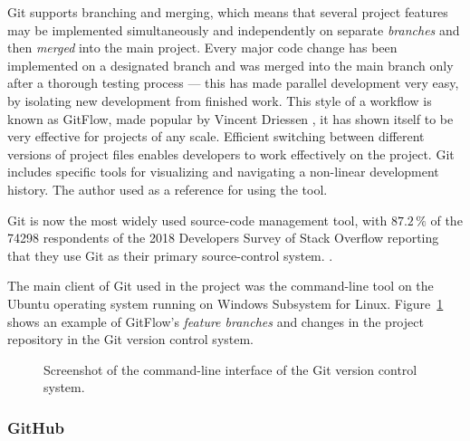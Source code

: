 \documentclass[english,engineering]{wizthesis}
\begin{document}
Git supports branching and merging, which means that several project features
may be implemented simultaneously and independently on separate \emph{branches}
and then \emph{merged} into the main project. Every major code change has been
implemented on a designated branch and was merged into the main branch only
after a thorough testing process --- this has made parallel development very
easy, by isolating new development from finished work. This style of a workflow
is known as GitFlow, made popular by Vincent Driessen \cite{git-flow}, it has
shown itself to be very effective for projects of any scale. Efficient switching
between different versions of project files enables developers to work
effectively on the project. Git includes specific tools for visualizing and
navigating a non-linear development history. The author used \cite{chacon-2014}
as a reference for using the tool.

Git is now the most widely used source-code management tool, with $87.2\,\%$ of
the 74298 respondents of the 2018 Developers Survey of Stack Overflow reporting
that they use Git as their primary source-control system.
\cite{stack-overflow-insights-2018}.

The main client of Git used in the project was the command-line tool on the
Ubuntu operating system running on Windows Subsystem for Linux.
Figure~\ref{fig:git} shows an example of GitFlow's \emph{feature branches} and
changes in the project repository in the Git version control system.

\begin{figure}[h]
  \centering
  \caption{Screenshot of the command-line interface of the Git version control
  system.}
  \label{fig:git}
\end{figure}

\subsubsection*{GitHub}
\end{document}
